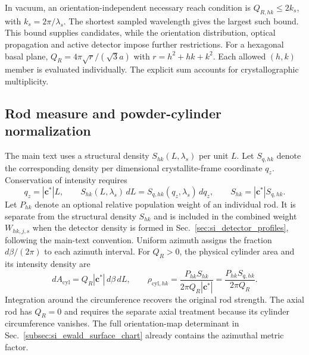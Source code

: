 In vacuum, an orientation-independent necessary reach condition is $Q_{R,hk}\leq2k_s$, with $k_s=2\pi/\lambda_s$. The shortest sampled wavelength gives the largest such bound. This bound supplies candidates, while the orientation distribution, optical propagation and active detector impose further restrictions. For a hexagonal basal plane, $Q_R=4\pi\sqrt{r}/(\sqrt{3}a)$ with $r=h^2+hk+k^2$. Each allowed $(h,k)$ member is evaluated individually. The explicit sum accounts for crystallographic multiplicity.

\subsection{Rod measure and powder-cylinder normalization}
\label{subsec:si_rod_measure}

The main text uses a structural density $S_{hk}(L,\lambda_s)$ per unit $L$. Let $S_{q,hk}$ denote the corresponding density per dimensional crystallite-frame coordinate $q_z$. Conservation of intensity requires
\begin{equation}
q_z=|\mathbf c^*|L,\qquad
S_{hk}(L,\lambda_s)\,dL=S_{q,hk}(q_z,\lambda_s)\,dq_z,\qquad
S_{hk}=|\mathbf c^*|S_{q,hk}.
\label{eq:si_rod_measure_conversion}
\end{equation}
Let $P_{hk}$ denote an optional relative population weight of an individual rod. It is separate from the structural density $S_{hk}$ and is included in the combined weight $W_{hk,j,s}$ when the detector density is formed in Sec.~\ref{sec:si_detector_profiles}, following the main-text convention. Uniform azimuth assigns the fraction $d\beta/(2\pi)$ to each azimuth interval. For $Q_R>0$, the physical cylinder area and its intensity density are
\begin{equation}
dA_{\mathrm{cyl}}=Q_R|\mathbf c^*|\,d\beta\,dL,\qquad
\rho_{\mathrm{cyl},hk}=\frac{P_{hk}S_{hk}}{2\pi Q_R|\mathbf c^*|}
=\frac{P_{hk}S_{q,hk}}{2\pi Q_R}.
\label{eq:si_cylinder_density}
\end{equation}
Integration around the circumference recovers the original rod strength. The axial rod has $Q_R=0$ and requires the separate axial treatment because its cylinder circumference vanishes. The full orientation-map determinant in Sec.~\ref{subsec:si_ewald_surface_chart} already contains the azimuthal metric factor.
